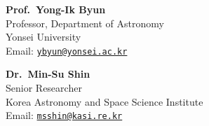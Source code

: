 \documentclass[letterpaper,11pt]{article}
\begin{document}
\vspace{0.2in}

\begin{minipage}[t]{0.48\linewidth}
\textbf{Prof.\ Yong-Ik Byun} \\
Professor, Department of Astronomy \\
Yonsei University \\
Email: \href{mailto:ybyun@yonsei.ac.kr}{\tt ybyun@yonsei.ac.kr}
\end{minipage}
\hfill
\begin{minipage}[t]{0.48\linewidth}
\textbf{Dr.\ Min-Su Shin} \\
Senior Researcher \\
Korea Astronomy and Space Science Institute \\
Email: \href{mailto:msshin@kasi.re.kr}{\tt msshin@kasi.re.kr}
\end{minipage}
\end{document}
